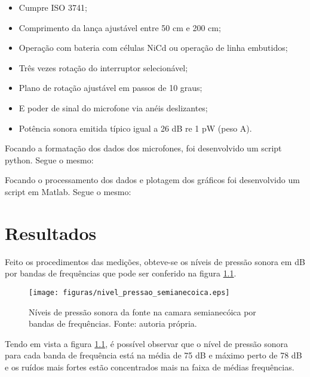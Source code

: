 \begin{itemize}
		\begin{itemize}
			\item Cumpre ISO 3741;
			\item Comprimento da lança ajustável entre 50 cm e 200 cm;
			\item Operação com bateria com células NiCd ou operação de linha embutidos;
			\item Três vezes rotação do interruptor selecionável;
			\item Plano de rotação ajustável em passos de 10 graus;
			\item E poder de sinal do microfone via anéis deslizantes;
			\item Potência sonora emitida típico igual a 26 dB re 1 pW (peso A).
		\end{itemize}
\end{itemize}


Focando a formatação dos dados dos microfones, foi desenvolvido um script python. Segue o mesmo:


Focando o processamento dos dados e plotagem dos gráficos foi desenvolvido um script em Matlab. Segue o mesmo:


\chapter{Resultados}\label{resultados}
Feito os procedimentos das medições, obteve-se os níveis de pressão sonora em dB por bandas de frequências que pode ser conferido na figura \ref{figura_3}.
\begin{figure}[h!]
    \hspace{-4.5cm}
    \texttt{[image: figuras/nivel\_pressao\_semianecoica.eps]}
    \caption{Níveis de pressão sonora da fonte na camara semianecóica por bandas de frequências. Fonte: autoria própria.}
    \label{figura_3}
\end{figure}

Tendo em vista a figura \ref{figura_3}, é possível observar que o nível de pressão sonora para cada banda de frequência está na média de 75 dB e máximo perto de 78 dB e os ruídos mais fortes estão concentrados mais na faixa de médias frequências.


